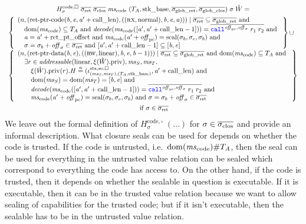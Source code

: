 \documentclass[acmsmall,review,anonymous]{acmart}\settopmatter{printfolios=true,printccs=false,printacmref=false}
\renewcommand{\decInstr}[1]{\plainfun{decode}{#1}}
\begin{document}
\begin{multline*}
  H^\mathrm{code,\square}_\sigma \; \sigrets \; \sigcloss \; \mscode \; (\ta,\stkb,\gsigrets,\gsigcloss) \; \sigma \; \hat{W}= \\
  \begin{array}[t]{l}
\left\{
    \begin{array}{l}
      \npair{\left(\retptrc(\baddr,\eaddr,\aaddr'+\calllen),((\rx,\normal),\baddr,\eaddr,\aaddr)\right)} \mid 
        \sigrets \subseteq \gsigrets \tand \\
        \quad\dom(\mscode) \subseteq \ta \tand 
        \decInstr{\mscode([\aaddr',\aaddr' + \calllen-1])} = \overline{\scall{\offpc,\offsigma}{r_1}{r_2}} \tand \\
        \quad\aaddr = \aaddr' + \retoffset \tand \mscode(\aaddr'+\offpc) = \seal{\sigma_b,\sigma_e,\sigma_b} \tand\\
        \quad \sigma = \sigma_b + \offsigma \in \sigrets \tand
        \lbrack \aaddr',\aaddr' + \calllen -1 \rbrack \subseteq \lbrack \baddr, \eaddr \rbrack
    \end{array}
      \right\} \cup \\
\left\{
    \begin{array}{l}
      \npair{(\retptrd(\baddr,\eaddr),((\rw,\linear),\baddr,\eaddr,\baddr-1))} \mid
        \sigrets \subseteq \gsigrets \tand 
        \dom(\mscode) \subseteq \ta \tand\\
        \quad \exists r \in \addressable{\linear,\pwpriv[\xi(\hat{W})]},\ms_S,\ms_T \ldotp\\
        \qquad\pwpriv[\xi(\hat{W})](r).H \nequal (\stareg[(\ms_S,\ms_T),(\ta,\stkb)]{\spao,\square}, \aaddr'+\calllen) \tand \\
        \qquad \dom(\ms_S) = \dom(\ms_T) = [\baddr,\eaddr] \tand\\
        \qquad \decInstr{\mscode([\aaddr',\aaddr' + \calllen-1])} = \overline{\scall{\offpc,\offsigma}{r_1}{r_2}} \tand \\
        \qquad \mscode(\aaddr'+\offpc) = \seal{\sigma_b,\sigma_e,\sigma_b} \tand \sigma = \sigma_b + \offsigma \in \sigrets
    \end{array}
    \right\} \\
  \end{array}\\
    \text{ if } \sigma \in \sigrets
\end{multline*}
We leave out the formal definition of $H^\mathrm{code,\square}_\sigma \; (\dots)$ for $\sigma \in \sigcloss$ and provide an informal description.
What closure seals can be used for depends on whether the code is trusted.
If the code is untrusted, i.e.\ $\dom(\mscode) \# \ta$, then the seal can be used for everything in the untrusted value relation can be sealed which correspond to everything the code has access to.
On the other hand, if the code is trusted, then it depends on whether the sealable in question is executable.
If it is executable, then it can be in the trusted value relation because we want to allow sealing of capabilities for the trusted code; but if it isn't executable, then the sealable has to be in the untrusted value relation.
\end{document}
